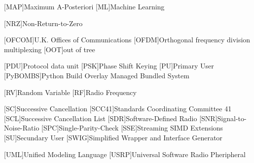 \begin{acronym}[TROLL]
  [MAP]{Maximum A-Posteriori}
  [ML]{Machine Learning}

  [NRZ]{Non-Return-to-Zero}

  [OFCOM]{U.K. Offices of Communications}
  [OFDM]{Orthogonal frequency division multiplexing}
  [OOT]{out of tree}

  [PDU]{Protocol data unit}
  [PSK]{Phase Shift Keying}
  [PU]{Primary User}
  [PyBOMBS]{Python Build Overlay Managed Bundled System}

  [RV]{Random Variable}
  [RF]{Radio Frequency}

  [SC]{Successive Cancellation}
  [SCC41]{Standards Coordinating Committee 41}
  [SCL]{Successive Cancellation List}
  [SDR]{Software-Defined Radio}
  [SNR]{Signal-to-Noise-Ratio}
  [SPC]{Single-Parity-Check}
  [SSE]{Streaming SIMD Extensions}
  [SU]{Secundary User}
  [SWIG]{Simplified Wrapper and Interface Generator}

 [UML]{Unified Modeling Language}
 [USRP]{Universal Software Radio Pheripheral}
\end{acronym}
